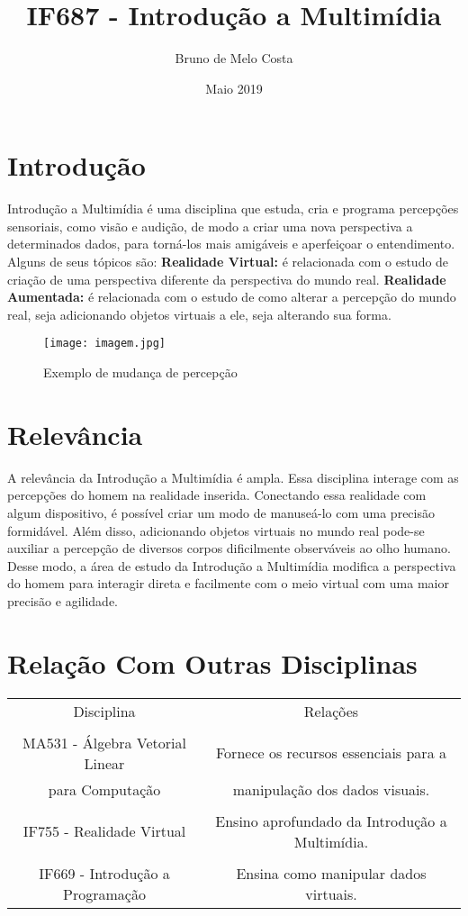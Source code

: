 \documentclass{article}
\title{IF687 - Introdução a Multimídia}
\author{Bruno de Melo Costa }
\date{Maio 2019}
\begin{document}
\maketitle

\section{Introdução}
Introdução a Multimídia é uma disciplina que estuda, cria e programa percepções sensoriais, como visão e audição, de modo a criar uma nova perspectiva a determinados dados, para torná-los mais amigáveis e aperfeiçoar  o entendimento.\citep{referenciasdisciplina} Alguns de seus tópicos são:\newline\newline
\textbf{Realidade Virtual:} é relacionada com o estudo de criação de uma perspectiva diferente da perspectiva do mundo real.\citep{referenciasdisciplina1}\newline
\textbf{Realidade Aumentada:} é relacionada com o estudo de como alterar a percepção do mundo real, seja adicionando objetos virtuais a ele, seja alterando sua forma.\citep{referenciasdisciplina2}

\begin{figure}[ht]
    \centering
    \texttt{[image: imagem.jpg]}
    \caption{Exemplo de mudança de percepção}\cite{figura}
    \label{fig:my_label}
\end{figure}

\section{Relevância}
A relevância da Introdução a Multimídia é ampla. Essa disciplina interage com as percepções do homem na realidade inserida. Conectando essa realidade com algum dispositivo, é possível criar um modo de manuseá-lo com uma precisão formidável. Além disso, adicionando objetos virtuais no mundo real pode-se auxiliar a percepção de diversos corpos dificilmente observáveis ao olho humano. Desse modo, a área de estudo da Introdução a Multimídia modifica a perspectiva do homem para interagir direta e facilmente com o meio virtual com uma maior precisão e agilidade.


\section{Relação Com Outras Disciplinas}
\begin{tabular}{c|c}
  Disciplina   &  Relações \\
   & \\
  MA531 - Álgebra Vetorial Linear & Fornece os recursos essenciais para a \\para Computação & manipulação dos dados visuais. \\ \\
  IF755 - Realidade Virtual & Ensino aprofundado da Introdução a Multimídia. \\ \\
  IF669 - Introdução a Programação & Ensina como manipular dados virtuais.	
\end{tabular}



\end{document}
